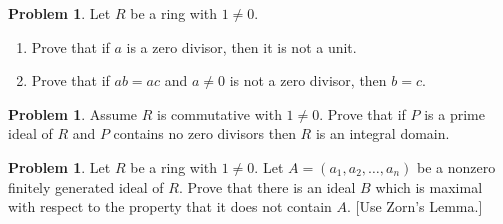 \documentclass{amsart}
\numberwithin{equation}{section}
\theoremstyle{definition}
\newtheorem{problem}[thm]{Problem}
\begin{document}


\begin{problem}
  Let \( R \) be a ring with \( 1\ne 0 \).
  \begin{enumerate}
  \item Prove that if \( a \) is a zero divisor, then it is not a
    unit.
  \item Prove that if \( ab=ac \) and \( a\ne0 \) is not a zero divisor,
  then \( b=c \).
  \end{enumerate}
\end{problem}



\begin{problem}
 Assume \(R\) is commutative with \( 1\ne0 \). Prove that if \(P\) is a prime ideal of \(R\) and \(P\) contains no zero divisors then \(R\) is an integral domain. 
\end{problem}



\begin{problem}
  Let \( R \) be a ring with \( 1\ne 0 \).
  Let \(A=\left(a_1, a_2, \ldots, a_n\right)\) be a nonzero finitely
  generated ideal of \(R\). Prove that there is an ideal \(B\) which
  is maximal with respect to the property that it does not contain
  \(A\). [Use Zorn’s Lemma.]
\end{problem}

\end{document}
